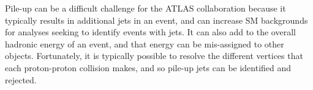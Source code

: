 Pile-up can be a difficult challenge for the ATLAS collaboration because it typically results in additional jets in an event, and can increase \ac{SM} backgrounds for analyses seeking to identify events with jets. It can also add to the overall hadronic energy of an event, and that energy can be mis-assigned to other objects. Fortunately, it is typically possible to resolve the different vertices that each proton-proton collision makes, and so pile-up jets can be identified and rejected. 


